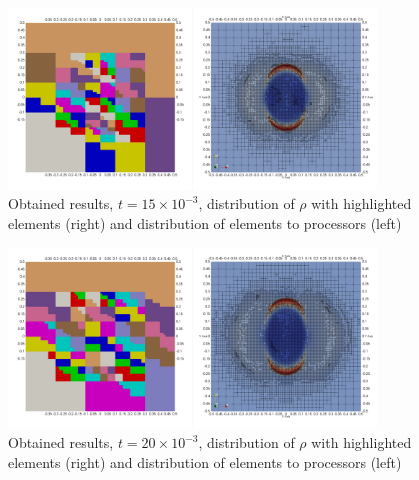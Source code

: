 \begin{figure}[H]
	\begin{center}
		\includegraphics[width=0.87\textwidth]{img/mhd-blast/old/mya4.jpg}
	\caption{Obtained results, $t = 15\times 10^{-3}$, distribution of $\rho$ with highlighted elements (right) and distribution of elements to processors (left)}
	\label{figure:blastOldMyAdapt4}
	\end{center}
\end{figure}
\vspace{-8mm}

\begin{figure}[H]
	\begin{center}
		\includegraphics[width=0.87\textwidth]{img/mhd-blast/old/mya5.jpg}
	\caption{Obtained results, $t = 20\times 10^{-3}$, distribution of $\rho$ with highlighted elements (right) and distribution of elements to processors (left)}
	\label{figure:blastOldMyAdapt5}
	\end{center}
\end{figure}
\vspace{-8mm}

